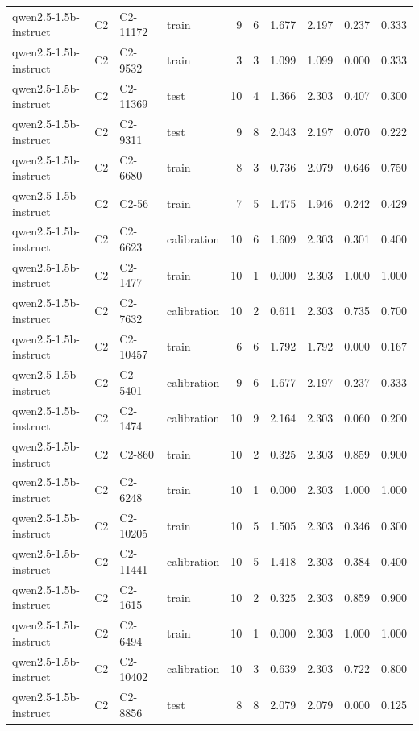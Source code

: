 \begin{table}
\begin{tabular}{llllrrrrrr}
qwen2.5-1.5b-instruct & C2 & C2-11172 & train & 9 & 6 & 1.677 & 2.197 & 0.237 & 0.333 \\
qwen2.5-1.5b-instruct & C2 & C2-9532 & train & 3 & 3 & 1.099 & 1.099 & 0.000 & 0.333 \\
qwen2.5-1.5b-instruct & C2 & C2-11369 & test & 10 & 4 & 1.366 & 2.303 & 0.407 & 0.300 \\
qwen2.5-1.5b-instruct & C2 & C2-9311 & test & 9 & 8 & 2.043 & 2.197 & 0.070 & 0.222 \\
qwen2.5-1.5b-instruct & C2 & C2-6680 & train & 8 & 3 & 0.736 & 2.079 & 0.646 & 0.750 \\
qwen2.5-1.5b-instruct & C2 & C2-56 & train & 7 & 5 & 1.475 & 1.946 & 0.242 & 0.429 \\
qwen2.5-1.5b-instruct & C2 & C2-6623 & calibration & 10 & 6 & 1.609 & 2.303 & 0.301 & 0.400 \\
qwen2.5-1.5b-instruct & C2 & C2-1477 & train & 10 & 1 & 0.000 & 2.303 & 1.000 & 1.000 \\
qwen2.5-1.5b-instruct & C2 & C2-7632 & calibration & 10 & 2 & 0.611 & 2.303 & 0.735 & 0.700 \\
qwen2.5-1.5b-instruct & C2 & C2-10457 & train & 6 & 6 & 1.792 & 1.792 & 0.000 & 0.167 \\
qwen2.5-1.5b-instruct & C2 & C2-5401 & calibration & 9 & 6 & 1.677 & 2.197 & 0.237 & 0.333 \\
qwen2.5-1.5b-instruct & C2 & C2-1474 & calibration & 10 & 9 & 2.164 & 2.303 & 0.060 & 0.200 \\
qwen2.5-1.5b-instruct & C2 & C2-860 & train & 10 & 2 & 0.325 & 2.303 & 0.859 & 0.900 \\
qwen2.5-1.5b-instruct & C2 & C2-6248 & train & 10 & 1 & 0.000 & 2.303 & 1.000 & 1.000 \\
qwen2.5-1.5b-instruct & C2 & C2-10205 & train & 10 & 5 & 1.505 & 2.303 & 0.346 & 0.300 \\
qwen2.5-1.5b-instruct & C2 & C2-11441 & calibration & 10 & 5 & 1.418 & 2.303 & 0.384 & 0.400 \\
qwen2.5-1.5b-instruct & C2 & C2-1615 & train & 10 & 2 & 0.325 & 2.303 & 0.859 & 0.900 \\
qwen2.5-1.5b-instruct & C2 & C2-6494 & train & 10 & 1 & 0.000 & 2.303 & 1.000 & 1.000 \\
qwen2.5-1.5b-instruct & C2 & C2-10402 & calibration & 10 & 3 & 0.639 & 2.303 & 0.722 & 0.800 \\
qwen2.5-1.5b-instruct & C2 & C2-8856 & test & 8 & 8 & 2.079 & 2.079 & 0.000 & 0.125 \\

\end{tabular}
\end{table}
